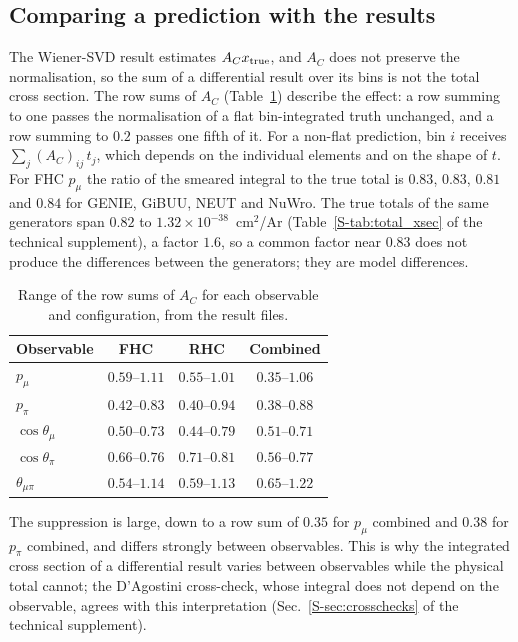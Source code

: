 \documentclass[11pt,a4paper]{article}
\newcommand{\suppref}[2]{#1~\ref{S-#2} of the technical supplement}
\begin{document}
\subsection{Comparing a prediction with the results}
\label{sec:ac_rowsums}

The Wiener-SVD result estimates $A_C x_{\rm true}$, and $A_C$ does not preserve the normalisation, so
the sum of a differential result over its bins is not the total cross section. The row sums of $A_C$
(Table~\ref{tab:ac_rowsums}) describe the effect: a row summing to one passes the normalisation of a
flat bin-integrated truth unchanged, and a row summing to $0.2$ passes one fifth of it. For a
non-flat prediction, bin $i$ receives $\sum_j (A_C)_{ij}\,t_j$, which depends on the individual
elements and on the shape of $t$. For FHC $p_\mu$ the ratio of the smeared integral to the true
total is $0.83$, $0.83$, $0.81$ and $0.84$ for GENIE, GiBUU, NEUT and NuWro. The true totals of the
same generators span $0.82$ to $1.32\times10^{-38}$~cm$^2$/Ar (\suppref{Table}{tab:total_xsec}), a
factor $1.6$, so a common factor near $0.83$ does not produce the differences between the
generators; they are model differences.

\begin{table}[H]
  \centering
  \caption{Range of the row sums of $A_C$ for each observable and configuration, from the result
    files.}
  \label{tab:ac_rowsums}
  \small
  \begin{tabular}{lccc}
\toprule
Observable & FHC & RHC & Combined \\
\midrule
$p_\mu$ & $0.59$--$1.11$ & $0.55$--$1.01$ & $0.35$--$1.06$ \\
$p_\pi$ & $0.42$--$0.83$ & $0.40$--$0.94$ & $0.38$--$0.88$ \\
$\cos\theta_\mu$ & $0.50$--$0.73$ & $0.44$--$0.79$ & $0.51$--$0.71$ \\
$\cos\theta_\pi$ & $0.66$--$0.76$ & $0.71$--$0.81$ & $0.56$--$0.77$ \\
$\theta_{\mu\pi}$ & $0.54$--$1.14$ & $0.59$--$1.13$ & $0.65$--$1.22$ \\
\bottomrule
\end{tabular}
\end{table}

The suppression is large, down to a row sum of $0.35$ for $p_\mu$ combined and $0.38$ for $p_\pi$ combined, and differs
strongly between observables. This is why the integrated cross section of a differential result
varies between observables while the physical total cannot; the D'Agostini cross-check, whose
integral does not depend on the observable, agrees with this interpretation
(\suppref{Sec.}{sec:crosschecks}).
\end{document}
